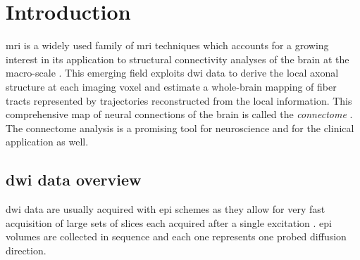 \section{Introduction}
\label{sec:introduction}

 \gls{mri} is a widely used family
of \gls{mri} techniques \citep{sundgren_diffusion_2004} which 
accounts for a growing interest in its application to structural 
connectivity analyses of the brain at the macro-scale
\citep{craddock_imaging_2013}. This emerging field exploits
\gls{dwi} data to derive the local axonal structure at each imaging voxel 
\citep{basser_microstructural_1996} and estimate a whole-brain mapping of fiber 
tracts \citep{hagmann_mr_2012,johansen-berg_using_2009} represented by 
trajectories reconstructed from the local information.
This comprehensive map of neural connections of the brain is called the 
\emph{connectome} \citep{hagmann_diffusion_2005,sporns_human_2005}. The connectome
analysis is a promising tool for neuroscience \citep{morgan_why_2013} and 
for the clinical application \citep{griffa_structural_2013} as well.



\subsection{\Gls{dwi} data overview}
\label{sec:dwi_overview}
\gls{dwi} data are usually acquired with \gls{epi} schemes
as they allow for very fast acquisition of large sets of slices each
acquired after a single excitation \citep{mukherjee_diffusion_2008,
soares_hitchhikers_2013}. \Gls{epi} volumes are collected
in sequence and each one represents one probed diffusion direction.

